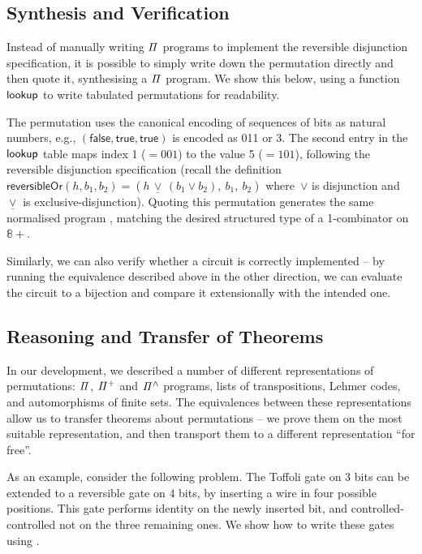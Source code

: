 \subsection{Synthesis and Verification}

Instead of manually writing $\mathit{\Pi}$ programs to implement the reversible disjunction specification, it is possible to
simply write down the permutation directly and then quote it, synthesising a $\mathit{\Pi}$ program. We show this below,
using a function $\operatorname{\mathsf{lookup}}$ to write tabulated permutations for readability.
\medskip
\resetperm{}
\vspace{-0.5em}

\noindent
The permutation uses the canonical encoding of sequences of bits as natural numbers, e.g.,
${(\mathsf{false},\mathsf{true},\mathsf{true})}$ is encoded as 011 or 3. The second entry in the $\operatorname{\mathsf{lookup}}$ table
maps index 1 (${= 001}$) to the value 5 (${= 101}$), following the reversible disjunction specification (recall the definition
$\mathsf{reversibleOr}(h,b_1,b_2) = (h \,\underline{\vee}\, (b_1 \vee b_2), ~b_1, ~b_2)$ where~$\vee$ is disjunction
and~$\underline{\vee}$ is exclusive-disjunction). Quoting this permutation generates the same normalised program
, matching the desired structured type of a 1-combinator on $\mathbb{8}+$.

Similarly, we can also verify whether a circuit is correctly implemented -- by running the equivalence described above
in the other direction, we can evaluate the circuit to a bijection and compare it extensionally with the intended one.

\subsection{Reasoning and Transfer of Theorems}

In our development, we described a number of different representations of permutations: $\mathit{\Pi}$, $\mathit{{\Pi}^{+}}$ and
$\mathit{{\Pi}^{\wedge}}$ programs, lists of transpositions, Lehmer codes, and automorphisms of finite sets. The equivalences between
these representations allow us to transfer theorems about permutations -- we prove them on the most suitable
representation, and then transport them to a different representation ``for free''.

As an example, consider the following problem. The Toffoli gate on 3 bits can be extended to a reversible gate on 4
bits, by inserting a wire in four possible positions. This gate performs identity on the newly inserted bit, and
controlled-controlled not on the three remaining ones. We show how to write these gates using .
\medskip
\extendedToffoli{}
\vspace{-0.5em}

